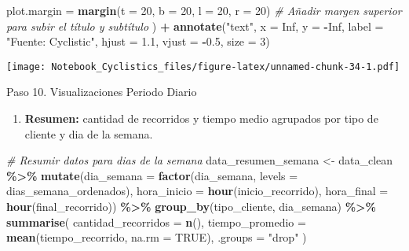 \documentclass[
]{article}
\newenvironment{Shaded}{\begin{snugshade}}{\end{snugshade}}
\newcommand{\AttributeTok}[1]{\textcolor[rgb]{0.13,0.29,0.53}{#1}}
\newcommand{\CommentTok}[1]{\textcolor[rgb]{0.56,0.35,0.01}{\textit{#1}}}
\newcommand{\ConstantTok}[1]{\textcolor[rgb]{0.56,0.35,0.01}{#1}}
\newcommand{\DecValTok}[1]{\textcolor[rgb]{0.00,0.00,0.81}{#1}}
\newcommand{\FloatTok}[1]{\textcolor[rgb]{0.00,0.00,0.81}{#1}}
\newcommand{\FunctionTok}[1]{\textcolor[rgb]{0.13,0.29,0.53}{\textbf{#1}}}
\newcommand{\NormalTok}[1]{#1}
\newcommand{\OtherTok}[1]{\textcolor[rgb]{0.56,0.35,0.01}{#1}}
\newcommand{\SpecialCharTok}[1]{\textcolor[rgb]{0.81,0.36,0.00}{\textbf{#1}}}
\newcommand{\StringTok}[1]{\textcolor[rgb]{0.31,0.60,0.02}{#1}}
\providecommand{\tightlist}{%
  \setlength{\itemsep}{0pt}\setlength{\parskip}{0pt}}
\begin{document}
\begin{Shaded}
\begin{Highlighting}[]
    \AttributeTok{plot.margin =} \FunctionTok{margin}\NormalTok{(}\AttributeTok{t =} \DecValTok{20}\NormalTok{, }\AttributeTok{b =} \DecValTok{20}\NormalTok{, }\AttributeTok{l =} \DecValTok{20}\NormalTok{, }\AttributeTok{r =} \DecValTok{20}\NormalTok{) }\CommentTok{\# Añadir margen superior para subir el título y subtítulo}
\NormalTok{  ) }\SpecialCharTok{+}
  \FunctionTok{annotate}\NormalTok{(}\StringTok{"text"}\NormalTok{, }\AttributeTok{x =} \ConstantTok{Inf}\NormalTok{, }\AttributeTok{y =} \SpecialCharTok{{-}}\ConstantTok{Inf}\NormalTok{, }\AttributeTok{label =} \StringTok{"Fuente: Cyclistic"}\NormalTok{, }\AttributeTok{hjust =} \FloatTok{1.1}\NormalTok{, }\AttributeTok{vjust =} \SpecialCharTok{{-}}\FloatTok{0.5}\NormalTok{, }\AttributeTok{size =} \DecValTok{3}\NormalTok{)}
\end{Highlighting}
\end{Shaded}

\texttt{[image: Notebook\_Cyclistics\_files/figure-latex/unnamed-chunk-34-1.pdf]}

\hfill\break
\hfill\break
Paso 10. Visualizaciones Periodo Diario

\begin{enumerate}
\def\labelenumi{\arabic{enumi}.}
\tightlist
\item
  \textbf{Resumen:} cantidad de recorridos y tiempo medio agrupados por
  tipo de cliente y dia de la semana.
\end{enumerate}

\begin{Shaded}
\begin{Highlighting}[]
  \CommentTok{\# Resumir datos para dias de la semana}
\NormalTok{  data\_resumen\_semana }\OtherTok{\textless{}{-}}\NormalTok{ data\_clean }\SpecialCharTok{\%\textgreater{}\%}
    \FunctionTok{mutate}\NormalTok{(}\AttributeTok{dia\_semana =} \FunctionTok{factor}\NormalTok{(dia\_semana, }\AttributeTok{levels =}\NormalTok{ dias\_semana\_ordenados),}
           \AttributeTok{hora\_inicio =} \FunctionTok{hour}\NormalTok{(inicio\_recorrido),}
           \AttributeTok{hora\_final =} \FunctionTok{hour}\NormalTok{(final\_recorrido)) }\SpecialCharTok{\%\textgreater{}\%}
    \FunctionTok{group\_by}\NormalTok{(tipo\_cliente, dia\_semana) }\SpecialCharTok{\%\textgreater{}\%}
    \FunctionTok{summarise}\NormalTok{(}
      \AttributeTok{cantidad\_recorridos =} \FunctionTok{n}\NormalTok{(),}
      \AttributeTok{tiempo\_promedio =} \FunctionTok{mean}\NormalTok{(tiempo\_recorrido, }\AttributeTok{na.rm =} \ConstantTok{TRUE}\NormalTok{),}
      \AttributeTok{.groups =} \StringTok{"drop"}
\NormalTok{    ) }
\end{Highlighting}
\end{Shaded}
\end{document}
